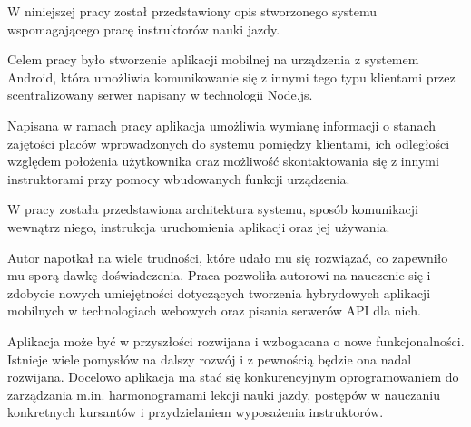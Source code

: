 \documentclass[twoside,a4paper,openright,12pt]{book}
\begin{document}
W niniejszej pracy został przedstawiony opis stworzonego systemu wspomagającego pracę instruktorów nauki jazdy.

Celem pracy było stworzenie aplikacji mobilnej na urządzenia z systemem Android, która umożliwia komunikowanie się z innymi tego typu klientami przez scentralizowany serwer napisany w technologii Node.js.

Napisana w ramach pracy aplikacja umożliwia wymianę informacji o stanach zajętości placów wprowadzonych do systemu pomiędzy klientami, ich odległości względem położenia użytkownika oraz możliwość skontaktowania się z innymi instruktorami przy pomocy wbudowanych funkcji urządzenia.

W pracy została przedstawiona architektura systemu, sposób komunikacji wewnątrz niego, instrukcja uruchomienia aplikacji oraz jej używania.

Autor napotkał na wiele trudności, które udało mu się rozwiązać, co zapewniło mu sporą dawkę doświadczenia. Praca pozwoliła autorowi na nauczenie się i zdobycie nowych umiejętności dotyczących tworzenia hybrydowych aplikacji mobilnych w technologiach webowych oraz pisania serwerów API dla nich.

Aplikacja może być w przyszłości rozwijana i wzbogacana o nowe funkcjonalności. Istnieje wiele pomysłów na dalszy rozwój i z pewnością będzie ona nadal rozwijana. Docelowo aplikacja ma stać się konkurencyjnym oprogramowaniem do zarządzania m.in. harmonogramami lekcji nauki jazdy, postępów w nauczaniu konkretnych kursantów i przydzielaniem wyposażenia instruktorów.

\backmatter

\listoffigures
\lstlistoflistings

\nocite{*}

\renewcommand{\bibname}{Literatura}

\end{document}
